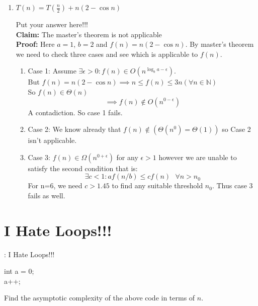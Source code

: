 \documentclass[a4paper,10pt]{article}
\newenvironment{answer}[1][height fill] {
    \begin{tcolorbox}[#1]
}
{
    \end{tcolorbox}
}
\begin{document}
\begin{enumerate}[label=(\roman*), wide]
\item $T(n) = T(\frac{n}{2}) + n(2-\cos{n})$
\begin{answer}
    Put your answer here!!!\\
    \textbf{Claim: } The master's theorem is not applicable\\
    \textbf{Proof: } Here $a=1$, $b=2$ and $f(n)=n(2-\cos{n})$. By master's theorem we need to check three cases and see which is applicable to $f(n)$.\\
    \begin{enumerate}
    	\item Case 1: Assume $\exists \epsilon>0 : f(n) \in O(n^{\log_b{a}-\epsilon})$. \\
    	But $f(n)=n(2-\cos{n}) \implies n \leq f(n) \leq 3n (\forall n \in \mathbb{N})$ \\
    	So $f(n) \in \Theta(n)$ \\
    	$$ \implies f(n) \notin O(n^{0-\epsilon}) $$
    	A contadiction. So case 1 fails.
    	\item Case 2: We know already that $f(n) \notin \left(\Theta(n^{0}) = \Theta(1) \right)$ so Case 2 isn't applicable.
    	\item Case 3: $f(n) \in \Omega(n^{0+\epsilon})$ for any $\epsilon > 1$ however we are unable to satisfy the second condition that is:
    	$$ \exists c<1 : af(n/b) \leq cf(n) \text{ } \forall n>n_0$$
    	For n=6, we need $c > 1.45$ to find any suitable threshold $n_0$. Thus case 3 fails as well.
    \end{enumerate}
\end{answer}
\end{enumerate}

\section{I Hate Loops!!!}
    \begin{algorithm}[H]
    \caption{: I Hate Loops!!!}
        \SetAlgoLined
        int a = 0;\\
         {
             {
                a++;
            }
        }
    \end{algorithm}

    
Find the asymptotic complexity of the above code in terms of $n$.
\end{document}
